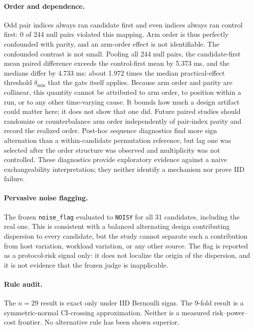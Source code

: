 \documentclass[10pt]{article}
\newcommand{\NullPairs}{244}
\newcommand{\ArmOrderMeanGap}{5.373}
\newcommand{\ArmOrderMedianGap}{4.733}
\newcommand{\ArmOrderRatio}{1.972}
\newcommand{\CandidateCount}{31}
\begin{document}
\paragraph{Order and dependence.}
Odd pair indices always ran candidate first and even indices always ran control
first: 0 of \NullPairs{} null pairs violated this mapping.  Arm order is thus
perfectly confounded with parity, and an arm-order effect is not identifiable.
The confounded contrast is not small.  Pooling all \NullPairs{} null pairs,
the candidate-first mean paired difference exceeds the control-first mean by
\ArmOrderMeanGap{} ms, and the medians differ by \ArmOrderMedianGap{} ms:
about \ArmOrderRatio{} times the median practical-effect threshold
$\delta_{\min}$ that the gate itself applies.  Because arm order and parity
are collinear, this quantity cannot be attributed to arm order, to position
within a run, or to any other time-varying cause.  It bounds how much a
design artifact could matter here; it does not show that one did.
Future paired studies should randomize or counterbalance arm order independently
of pair-index parity and record the realized order.
Post-hoc sequence diagnostics find more sign alternation than a
within-candidate permutation reference, but lag one was selected after the
order structure was observed and multiplicity was not controlled.  These
diagnostics provide exploratory evidence against a naive exchangeability
interpretation; they neither identify a mechanism nor prove IID failure.

\paragraph{Pervasive noise flagging.}
The frozen \texttt{noise\_flag} evaluated to \texttt{NOISY} for all
\CandidateCount{} candidates, including the real one.  This is consistent
with a balanced alternating design contributing dispersion to every
candidate, but the study cannot separate such a contribution from host
variation, workload variation, or any other source.  The flag is reported
as a protocol-risk signal only: it does not localize the origin of the
dispersion, and it is not evidence that the frozen judge is inapplicable.

\paragraph{Rule audit.}
The $n=29$ result is exact only under IID Bernoulli signs.  The 9-fold result is
a symmetric-normal CI-crossing approximation.  Neither is a measured
risk--power--cost frontier.  No alternative rule has been shown superior.
\end{document}
